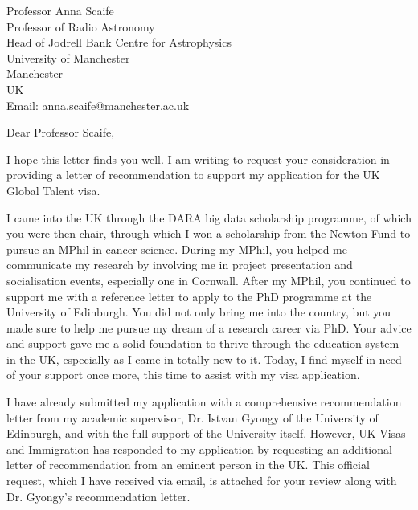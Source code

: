 \documentclass[12pt,a4paper]{letter}
\begin{document}
\begin{letter}{Professor Anna Scaife\\Professor of Radio Astronomy\\Head of Jodrell Bank Centre for Astrophysics\\University of Manchester\\Manchester\\UK\\Email: anna.scaife@manchester.ac.uk}

\date{\today}

\opening{Dear Professor Scaife,}

I hope this letter finds you well. I am writing to request your consideration in providing a letter of recommendation to support my application for the UK Global Talent visa.

I came into the UK through the DARA big data scholarship programme, of which you were then chair, through which I won a scholarship from the Newton Fund to pursue an MPhil in cancer science. During my MPhil, you helped me communicate my research by involving me in project presentation and socialisation events, especially one in Cornwall. After my MPhil, you continued to support me with a reference letter to apply to the PhD programme at the University of Edinburgh. You did not only bring me into the country, but you made sure to help me pursue my dream of a research career via PhD. Your advice and support gave me a solid foundation to thrive through the education system in the UK, especially as I came in totally new to it. Today, I find myself in need of your support once more, this time to assist with my visa application.

I have already submitted my application with a comprehensive recommendation letter from my academic supervisor, Dr. Istvan Gyongy of the University of Edinburgh, and with the full support of the University itself. However, UK Visas and Immigration has responded to my application by requesting an additional letter of recommendation from an eminent person in the UK. This official request, which I have received via email, is attached for your review along with Dr. Gyongy's recommendation letter.


\end{letter}
\end{document}
